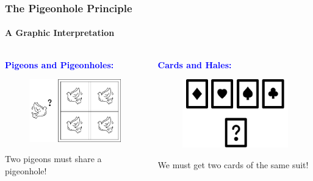 \documentclass[9pt,    %
    english,            %
    xcolor=table,       %
    envcountsect,        %
    aspectratio=169     %
]{beamer}
\begin{document}
\begin{frame}
    \frametitle{The Pigeonhole Principle}
    \framesubtitle{A Graphic Interpretation}

    \begin{columns}[t]
        \begin{column}{.45\textwidth}
            \textbf{\textcolor{blue}{Pigeons and Pigeonholes:}}
            \begin{figure}[t]
                \centering
                \includegraphics[width=.7\textwidth]{images/pigeons.png}
            \end{figure}
            Two pigeons must share a pigeonhole!
        \end{column}
        \hfill
        \begin{column}{.45\textwidth}
            \textbf{\textcolor{blue}{Cards and Hales:}}
            \begin{figure}[t]
                \centering
                \includegraphics[width=.75\textwidth]{images/cards_hales.png}
            \end{figure}
            We must get two cards of the same suit!
        \end{column}
    \end{columns}

\end{frame}
\end{document}
